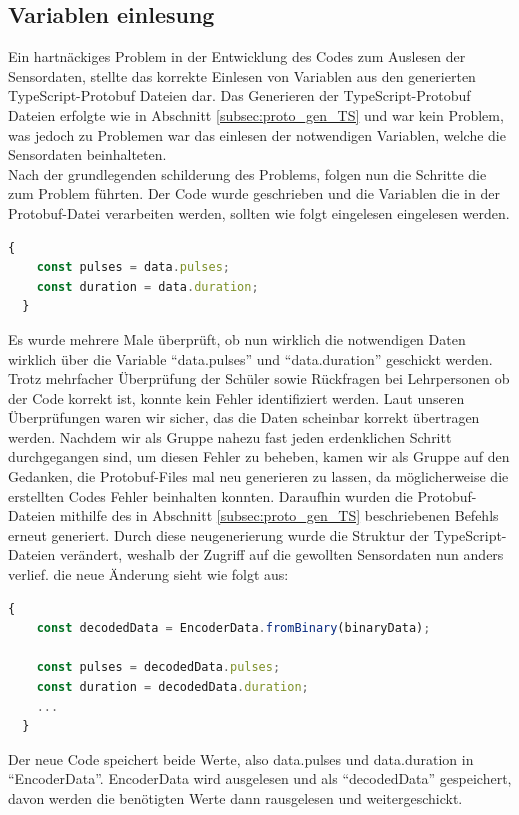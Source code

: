 \subsection{Variablen einlesung}
\label{subsubsec:problem_variablen_einlesen}
Ein hartnäckiges Problem in der Entwicklung des Codes zum Auslesen der Sensordaten, 
stellte das korrekte Einlesen von Variablen aus den generierten TypeScript-Protobuf Dateien dar.
%
Das Generieren der TypeScript-Protobuf Dateien erfolgte wie in Abschnitt \ref{subsec:proto_gen_TS} 
und war kein Problem, was jedoch zu Problemen war das einlesen der notwendigen Variablen, 
welche die Sensordaten beinhalteten. 
% 
\\
Nach der grundlegenden schilderung des Problems, folgen nun die Schritte die zum Problem führten.
%
Der Code wurde geschrieben und die Variablen die in der Protobuf-Datei verarbeiten werden, 
sollten wie folgt eingelesen eingelesen werden.
\begin{lstlisting}[language=JavaScript, gobble=4]
  {
    const pulses = data.pulses;
    const duration = data.duration;
  }
\end{lstlisting}
%
Es wurde mehrere Male überprüft, ob nun wirklich die notwendigen Daten wirklich über die Variable 
``data.pulses'' und ``data.duration'' geschickt werden. 
%
Trotz mehrfacher Überprüfung der Schüler sowie Rückfragen bei Lehrpersonen ob der Code korrekt ist, 
konnte kein Fehler identifiziert werden. 
Laut unseren Überprüfungen waren wir sicher, das die Daten scheinbar korrekt übertragen werden.
%
Nachdem wir als Gruppe nahezu fast jeden erdenklichen Schritt durchgegangen sind, um diesen Fehler zu beheben,
kamen wir als Gruppe auf den Gedanken, die Protobuf-Files mal neu generieren zu lassen, da möglicherweise 
die erstellten Codes Fehler beinhalten konnten. 
%
Daraufhin wurden die Protobuf-Dateien mithilfe des in Abschnitt \ref{subsec:proto_gen_TS} beschriebenen
Befehls erneut generiert.
%
Durch diese neugenerierung wurde die Struktur der TypeScript-Dateien verändert, 
weshalb der Zugriff auf die gewollten Sensordaten nun anders verlief.
%
die neue Änderung sieht wie folgt aus:
\begin{lstlisting}[language=JavaScript, gobble=4]
  {
    const decodedData = EncoderData.fromBinary(binaryData);

    const pulses = decodedData.pulses;
    const duration = decodedData.duration;
    ...
  }
\end{lstlisting}
Der neue Code speichert beide Werte, also data.pulses und data.duration in ``EncoderData''.
EncoderData wird ausgelesen und als ``decodedData'' gespeichert, davon werden die benötigten Werte
dann rausgelesen und weitergeschickt.

